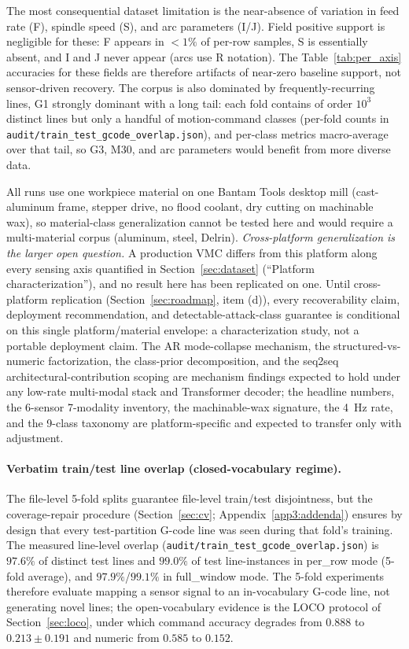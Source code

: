 \documentclass[sensors,article,submit,moreauthors,pdftex]{Definitions/mdpi}
\begin{document}
The most consequential dataset limitation is the near-absence of variation in feed rate (F), spindle speed (S), and arc parameters (I/J). Field positive support is negligible for these: F appears in $<\!1\%$ of per-row samples, S is essentially absent, and I and J never appear (arcs use R notation). The Table~\ref{tab:per_axis} accuracies for these fields are therefore artifacts of near-zero baseline support, not sensor-driven recovery. The corpus is also dominated by frequently-recurring lines, G1 strongly dominant with a long tail: each fold contains of order $10^3$ distinct lines but only a handful of motion-command classes (per-fold counts in \texttt{audit/train\_test\_gcode\_overlap.json}), and per-class metrics macro-average over that tail, so G3, M30, and arc parameters would benefit from more diverse data.

All runs use one workpiece material on one Bantam Tools desktop mill (cast-aluminum frame, stepper drive, no flood coolant, dry cutting on machinable wax), so material-class generalization cannot be tested here and would require a multi-material corpus (aluminum, steel, Delrin). \emph{Cross-platform generalization is the larger open question.} A production VMC differs from this platform along every sensing axis quantified in Section~\ref{sec:dataset} (``Platform characterization''), and no result here has been replicated on one. Until cross-platform replication (Section~\ref{sec:roadmap}, item (d)), every recoverability claim, deployment recommendation, and detectable-attack-class guarantee is conditional on this single platform/material envelope: a characterization study, not a portable deployment claim. The AR mode-collapse mechanism, the structured-vs-numeric factorization, the class-prior decomposition, and the seq2seq architectural-contribution scoping are mechanism findings expected to hold under any low-rate multi-modal stack and Transformer decoder; the headline numbers, the 6-sensor 7-modality inventory, the machinable-wax signature, the 4~Hz rate, and the 9-class taxonomy are platform-specific and expected to transfer only with adjustment.

\paragraph{Verbatim train/test line overlap (closed-vocabulary regime).} The file-level 5-fold splits guarantee file-level train/test disjointness, but the coverage-repair procedure (Section~\ref{sec:cv}; Appendix~\ref{app3:addenda}) ensures by design that every test-partition G-code line was seen during that fold's training. The measured line-level overlap (\texttt{audit/train\_test\_gcode\_overlap.json}) is $97.6\%$ of distinct test lines and $99.0\%$ of test line-instances in per\_row mode (5-fold average), and $97.9\%$/$99.1\%$ in full\_window mode. The 5-fold experiments therefore evaluate mapping a sensor signal to an in-vocabulary G-code line, not generating novel lines; the open-vocabulary evidence is the LOCO protocol of Section~\ref{sec:loco}, under which command accuracy degrades from $0.888$ to $0.213 \pm 0.191$ and numeric from $0.585$ to $0.152$.
\end{document}
